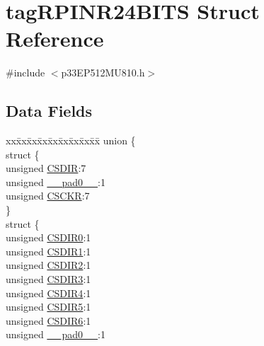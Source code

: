 \hypertarget{structtag_r_p_i_n_r24_b_i_t_s}{}\section{tag\+R\+P\+I\+N\+R24\+B\+I\+TS Struct Reference}
\label{structtag_r_p_i_n_r24_b_i_t_s}


{\ttfamily \#include $<$p33\+E\+P512\+M\+U810.\+h$>$}

\subsection*{Data Fields}
\begin{DoxyCompactItemize}
\item 
\begin{tabbing}
xx\=xx\=xx\=xx\=xx\=xx\=xx\=xx\=xx\=\kill
union \{\\
\>struct \{\\
\>\>unsigned \hyperlink{structtag_r_p_i_n_r24_b_i_t_s_a9c70c9ef4142b77d4853ecd9bbe969b0}{CSDIR}:7\\
\>\>unsigned \hyperlink{structtag_r_p_i_n_r24_b_i_t_s_adf71f3d8410c1f1dbbc96680a92c49af}{\_\_pad0\_\_}:1\\
\>\>unsigned \hyperlink{structtag_r_p_i_n_r24_b_i_t_s_a1821204fbd81999a70bd062f9867e80f}{CSCKR}:7\\
\>\} \\
\>struct \{\\
\>\>unsigned \hyperlink{structtag_r_p_i_n_r24_b_i_t_s_aab9fabd8139451da3ee4f8ee6bc8d427}{CSDIR0}:1\\
\>\>unsigned \hyperlink{structtag_r_p_i_n_r24_b_i_t_s_a72a109e302f948fe130fe743e00fd275}{CSDIR1}:1\\
\>\>unsigned \hyperlink{structtag_r_p_i_n_r24_b_i_t_s_a8c3be188ac147ed50d3aa84355035e88}{CSDIR2}:1\\
\>\>unsigned \hyperlink{structtag_r_p_i_n_r24_b_i_t_s_a1b21e173d6e11232ff06c2b40d0fe2cf}{CSDIR3}:1\\
\>\>unsigned \hyperlink{structtag_r_p_i_n_r24_b_i_t_s_a006ac794d50048f44cc755929f0ba3bd}{CSDIR4}:1\\
\>\>unsigned \hyperlink{structtag_r_p_i_n_r24_b_i_t_s_a61b2dcf647a176e3e8a89c6ca1c4f8e2}{CSDIR5}:1\\
\>\>unsigned \hyperlink{structtag_r_p_i_n_r24_b_i_t_s_a626381e5c26a2333c7d7a39a0b68f71a}{CSDIR6}:1\\
\>\>unsigned \hyperlink{structtag_r_p_i_n_r24_b_i_t_s_adf71f3d8410c1f1dbbc96680a92c49af}{\_\_pad0\_\_}:1\\

\end{tabbing}
\end{DoxyCompactItemize}
